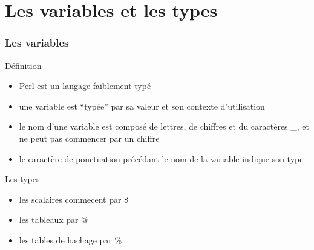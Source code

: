 \section{Les variables et les types}

\begin{frame}[fragile]
  \frametitle{Les variables}

  \begin{block}{Définition}
    \begin{itemize}
      \item Perl est un langage faiblement typé
      \item une variable est ``typée'' par sa valeur et son contexte
        d'utilisation
      \item le nom d'une variable est composé de lettres, de chiffres et du
        caractères \_, et ne peut pas commencer par un chiffre
      \item le caractère de ponctuation précédant le nom de la variable
        indique son type
    \end{itemize}
  \end{block}

  \begin{exampleblock}{Les types}
    \begin{itemize}
    \item les scalaires commecent par \$
    \item les tableaux par @
    \item les tables de hachage par \%
    \end{itemize}
  \end{exampleblock}

\end{frame}

